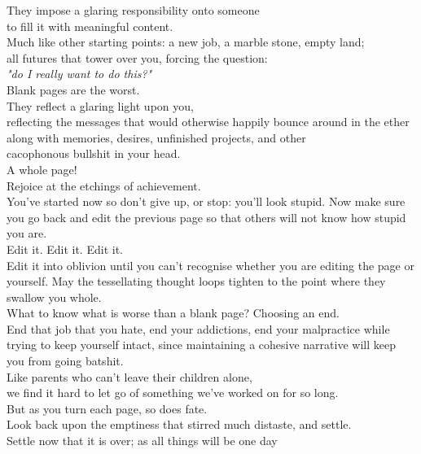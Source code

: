They impose a glaring responsibility onto someone\\
to fill it with meaningful content.\\
Much like other starting points:
a new job, a marble stone, empty land;\\
all futures that tower over you, forcing the question:\\
\emph{"do I really want to do this?"}
\vspace{7pt}\\
Blank pages are the worst.\\
They reflect a glaring light upon you,\\reflecting the messages that would otherwise happily bounce around in the ether along with memories, desires, unfinished projects, and other\\
cacophonous bullshit in your head.
\vspace{7pt}\\
A whole page!\\
Rejoice at the etchings of achievement.\\You've started now so don't give up, or stop: you'll look stupid. Now make sure you go back and edit the previous page so that others will not know how stupid you are.
\vspace{7pt}\\
Edit it. Edit it. Edit it.\\
Edit it into oblivion until you can't recognise whether you are editing the page or yourself. May the tessellating thought loops tighten to the point where they swallow you whole.
\vspace{7pt}\\
What to know what is worse than a blank page?
Choosing an end.\\End that job that you hate, end your addictions, end your malpractice while trying to keep yourself intact, since maintaining a cohesive narrative will keep you from going batshit.
\vspace{7pt}\\
Like parents who can't leave their children alone,\\ we find it hard to let go of something we've worked on for so long.\\
But as you turn each page, so does fate.\\Look back upon the emptiness that stirred much distaste,
and settle.\\
Settle now that it is over; as all things will be one day
\clearpage


